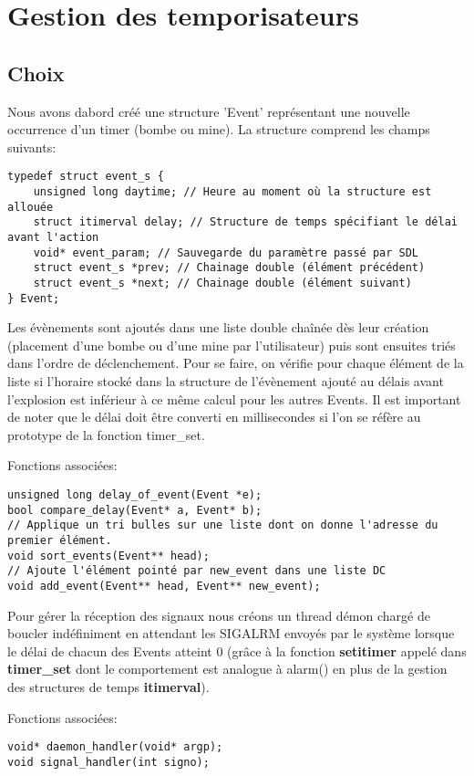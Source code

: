 \documentclass[a4paper]{article}
\begin{document}
\section{Gestion des temporisateurs}
\subsection{Choix}
Nous avons dabord créé une structure 'Event' représentant une nouvelle occurrence d'un timer (bombe ou mine). La structure comprend les champs suivants:

\begin{verbatim}
typedef struct event_s {
    unsigned long daytime; // Heure au moment où la structure est allouée
    struct itimerval delay; // Structure de temps spécifiant le délai avant l'action
    void* event_param; // Sauvegarde du paramètre passé par SDL
    struct event_s *prev; // Chainage double (élément précédent)
    struct event_s *next; // Chainage double (élément suivant)
} Event;
\end{verbatim}

Les évènements sont ajoutés dans une liste double chaînée dès leur création (placement d'une bombe ou d'une mine par l'utilisateur) puis sont ensuites triés dans l'ordre de déclenchement. Pour se faire, on vérifie pour chaque élément de la liste si l'horaire stocké dans la structure de l'évènement ajouté au délais avant l'explosion est inférieur à ce même calcul pour les autres Events. Il est important de noter que le délai doit être converti en millisecondes si l'on se réfère au prototype de la fonction timer\_set.

Fonctions associées:
\begin{verbatim}
unsigned long delay_of_event(Event *e);
bool compare_delay(Event* a, Event* b);
// Applique un tri bulles sur une liste dont on donne l'adresse du premier élément.
void sort_events(Event** head);
// Ajoute l'élément pointé par new_event dans une liste DC 
void add_event(Event** head, Event** new_event);
\end{verbatim}

Pour gérer la réception des signaux nous créons un thread démon chargé de boucler indéfiniment en attendant les SIGALRM envoyés par le système lorsque le délai de chacun des Events atteint 0 (grâce à la fonction \textbf{setitimer} appelé dans \textbf{timer\_set} dont le comportement est analogue à alarm() en plus de la gestion des structures de temps \textbf{itimerval}).

Fonctions associées:
\begin{verbatim}
void* daemon_handler(void* argp);
void signal_handler(int signo);
\end{verbatim}
\end{document}
